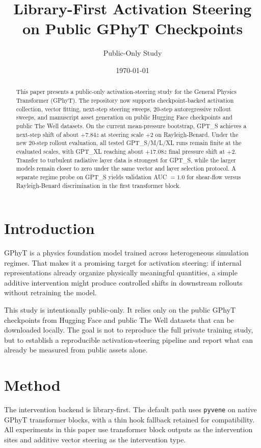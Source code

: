 \documentclass[11pt]{article}
\title{Library-First Activation Steering on Public GPhyT Checkpoints}
\author{Public-Only Study}
\date{\today}
\begin{document}
\maketitle

\begin{abstract}
This paper presents a public-only activation-steering study for the General
Physics Transformer (GPhyT). The repository now supports checkpoint-backed
activation collection, vector fitting, next-step steering sweeps, 20-step
autoregressive rollout sweeps, and manuscript asset generation on public
Hugging Face checkpoints and public The Well datasets. On the current
mean-pressure bootstrap, GPT\_S achieves a next-step shift of about \(+7.84z\)
at steering scale \(+2\) on Rayleigh-Benard. Under the new 20-step rollout
evaluation, all tested GPT\_S/M/L/XL runs remain finite at the evaluated
scales, with GPT\_XL reaching about \(+17.08z\) final pressure shift at
\(+2\). Transfer to turbulent radiative layer data is strongest for GPT\_S,
while the larger models remain closer to zero under the same vector and layer
selection protocol. A separate regime probe on GPT\_S yields validation
AUC \(= 1.0\) for shear-flow versus Rayleigh-Benard discrimination in the first
transformer block.
\end{abstract}

\section{Introduction}

GPhyT is a physics foundation model trained across heterogeneous simulation
regimes. That makes it a promising target for activation steering: if internal
representations already organize physically meaningful quantities, a simple
additive intervention might produce controlled shifts in downstream rollouts
without retraining the model.

This study is intentionally public-only. It relies only on the public
GPhyT checkpoints from Hugging Face and public The Well datasets that can be
downloaded locally. The goal is not to reproduce the full private training
study, but to establish a reproducible activation-steering pipeline and report
what can already be measured from public assets alone.

\section{Method}

The intervention backend is library-first. The default path uses
\texttt{pyvene} on native GPhyT transformer blocks, with a thin hook fallback
retained for compatibility. All experiments in this paper use transformer block
outputs as the intervention sites and additive vector steering as the
intervention type.
\end{document}
